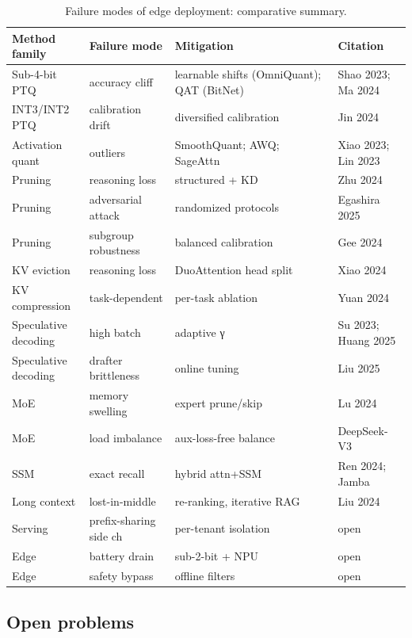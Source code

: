 \documentclass{article}
\begin{document}
\begin{table}[t]
\centering
\caption{Failure modes of edge deployment: comparative summary.}
\label{tab:failure-modes-of-edge-deployment}
\begin{tabular}{>{\raggedright\arraybackslash}p{0.1942\linewidth}
  >{\raggedright\arraybackslash}p{0.2136\linewidth}
  >{\raggedright\arraybackslash}p{0.4078\linewidth}
  >{\raggedright\arraybackslash}p{0.1845\linewidth}}
\toprule
Method family & Failure mode & Mitigation & Citation \\
\midrule
Sub-4-bit PTQ & accuracy cliff & learnable shifts (OmniQuant); QAT (BitNet) & Shao 2023; Ma 2024 \\
INT3/INT2 PTQ & calibration drift & diversified calibration & Jin 2024 \\
Activation quant & outliers & SmoothQuant; AWQ; SageAttn & Xiao 2023; Lin 2023 \\
Pruning & reasoning loss & structured + KD & Zhu 2024 \\
Pruning & adversarial attack & randomized protocols & Egashira 2025 \\
Pruning & subgroup robustness & balanced calibration & Gee 2024 \\
KV eviction & reasoning loss & DuoAttention head split & Xiao 2024 \\
KV compression & task-dependent & per-task ablation & Yuan 2024 \\
Speculative decoding & high batch & adaptive γ & Su 2023; Huang 2025 \\
Speculative decoding & drafter brittleness & online tuning & Liu 2025 \\
MoE & memory swelling & expert prune/skip & Lu 2024 \\
MoE & load imbalance & aux-loss-free balance & DeepSeek-V3 \\
SSM & exact recall & hybrid attn+SSM & Ren 2024; Jamba \\
Long context & lost-in-middle & re-ranking, iterative RAG & Liu 2024 \\
Serving & prefix-sharing side ch & per-tenant isolation & open \\
Edge & battery drain & sub-2-bit + NPU & open \\
Edge & safety bypass & offline filters & open \\
\end{tabular}
\end{table}

\subsection{Open problems}\label{open-problems}
\end{document}
